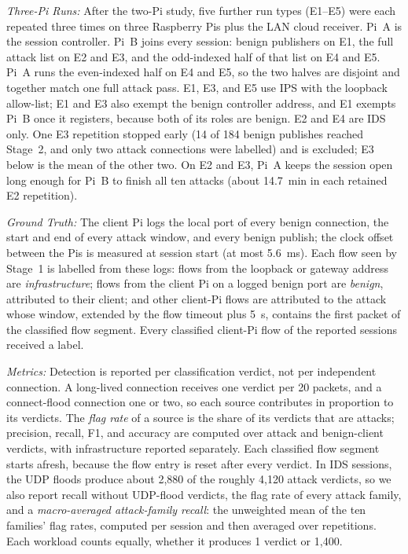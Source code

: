 \documentclass[journal]{IEEEtran}
\begin{document}
\textit{Three-Pi Runs:} After the two-Pi study, five further run types (E1--E5) were each repeated three times on three Raspberry Pis plus the LAN cloud receiver. Pi~A is the session controller. Pi~B joins every session: benign publishers on E1, the full attack list on E2 and E3, and the odd-indexed half of that list on E4 and E5. Pi~A runs the even-indexed half on E4 and E5, so the two halves are disjoint and together match one full attack pass. E1, E3, and E5 use IPS with the loopback allow-list; E1 and E3 also exempt the benign controller address, and E1 exempts Pi~B once it registers, because both of its roles are benign. E2 and E4 are IDS only. One E3 repetition stopped early (14 of 184 benign publishes reached Stage~2, and only two attack connections were labelled) and is excluded; E3 below is the mean of the other two. On E2 and E3, Pi~A keeps the session open long enough for Pi~B to finish all ten attacks (about 14.7~min in each retained E2 repetition).

\textit{Ground Truth:} The client Pi logs the local port of every benign connection, the start and end of every attack window, and every benign publish; the clock offset between the Pis is measured at session start (at most 5.6~ms). Each flow seen by Stage~1 is labelled from these logs: flows from the loopback or gateway address are \emph{infrastructure}; flows from the client Pi on a logged benign port are \emph{benign}, attributed to their client; and other client-Pi flows are attributed to the attack whose window, extended by the flow timeout plus 5~s, contains the first packet of the classified flow segment. Every classified client-Pi flow of the reported sessions received a label.

\textit{Metrics:} Detection is reported per classification verdict, not per independent connection. A long-lived connection receives one verdict per 20 packets, and a connect-flood connection one or two, so each source contributes in proportion to its verdicts. The \emph{flag rate} of a source is the share of its verdicts that are attacks; precision, recall, F1, and accuracy are computed over attack and benign-client verdicts, with infrastructure reported separately. Each classified flow segment starts afresh, because the flow entry is reset after every verdict. In IDS sessions, the UDP floods produce about 2,880 of the roughly 4,120 attack verdicts, so we also report recall without UDP-flood verdicts, the flag rate of every attack family, and a \emph{macro-averaged attack-family recall}: the unweighted mean of the ten families' flag rates, computed per session and then averaged over repetitions. Each workload counts equally, whether it produces 1 verdict or 1,400.
\end{document}
